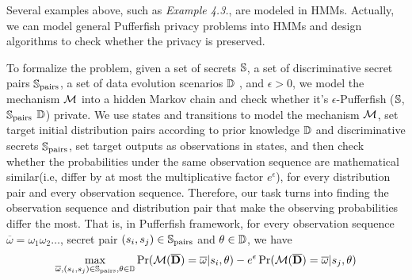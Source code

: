 \iffalse
Actually, we formulate the above Pufferfish privacy cases into Hidden Markov Models.
For instance, in \textit{Example 3}, the state space consists of ($0, 1, 2, \underline{0}, \underline{1}, \underline{2}$).
The states $\underline{0}$, $\underline{1}$ and $\underline{2}$ emit, with certainty,
observation $\textit{zero}$, $\textit{one}$ and $\textit{two}$ respectively.
Even though the attacker has the prior knowledge that the disease is contagious,
we want to make sure that he won't infer whether any member in the data set
has contracted the disease or not. Thus the initial distribution pair the attacker gets would be
($1,0,0,0,0,0$) and ($0,0,1,0,0,0$). And since the probabilities of observing
$\textit{zero}$ are $\frac{2}{3}$ and $\frac{1}{6}$, this violates $\ln(2)$-Pufferfish privacy.
\fi

Several examples above, such as \textit{Example 4.3.}, are modeled in HMMs. 
Actually, we can model general Pufferfish privacy problems into HMMs and
design algorithms to check whether the privacy is preserved.

To formalize the problem, given a set of secrets $\mathbb{S}$,
a set of discriminative secret pairs $\mathbb{S}_{\textmd{pairs}}$, a set of data evolution
scenarios $\mathbb{D}$ , and $\epsilon > 0$, we model the mechanism  $\mathcal{M}$ into a hidden Markov chain
and check whether it's $\epsilon$-Pufferfish ($\mathbb{S}$, $\mathbb{S}_{\textmd{pairs}}$
$\mathbb{D}$) private. We use states and transitions to model the mechanism $\mathcal{M}$,
set target initial distribution pairs according to prior knowledge $\mathbb{D}$ and discriminative secrets $\mathbb{S}_{\textmd{pairs}}$,
set target outputs as observations in states, and then check whether the probabilities under the same observation sequence
are mathematical similar(i.e, differ by at most the multiplicative factor $e^{\epsilon}$), for every distribution pair and every observation sequence.
Therefore, our task turns into finding the observation sequence and distribution pair that make the observing probabilities differ the most.
That is, in Pufferfish framework, for every observation sequence $\overline{\omega}=\omega_1\omega_2\ldots$, secret pair $(s_i, s_j) \in
\mathbb{S}_{\textmd{pairs}}$ and $\theta \in \mathbb{D}$, we have
  \begin{equation}\label{max1}
     \max_{\overline{\omega},(s_i, s_j) \in
    \mathbb{S}_{\textmd{pairs}},\theta \in \mathbb{D}}
    { \Pr (\mathcal{M} (\overline{\mathbf{D}}) = \overline{\omega}| s_i, \theta) - e^\epsilon \Pr (\mathcal{M} (\overline{\mathbf{D}}) = \overline{\omega}| s_j, \theta) }
  \end{equation}


